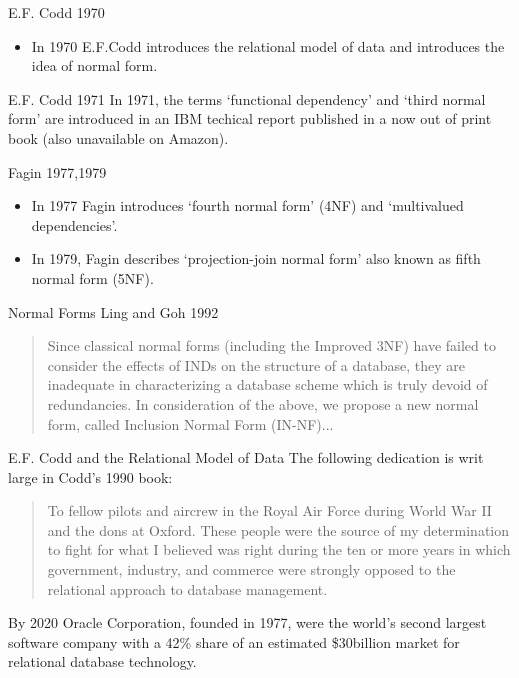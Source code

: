 
\begin{frame}{E.F. Codd 1970}
\begin{itemize}
	\item In 1970 E.F.Codd introduces the relational model of data and introduces the idea of normal form.
\end{itemize}
\end{frame}

\begin{frame}{E.F. Codd 1971}
In 1971, the terms `functional dependency' and  `third normal form' are introduced 
in an IBM techical report published in a now out of print book (also unavailable on Amazon).

\end{frame}

\begin{frame}{Fagin 1977,1979}
\begin{itemize}
	\item In 1977 Fagin introduces `fourth normal form' (4NF) and `multivalued dependencies'.
	\item In 1979, Fagin describes `projection-join normal form' also known as fifth normal form (5NF).
\end{itemize}

\end{frame}

\begin{frame}{Normal Forms}
Ling and Goh 1992 
\begin{quote}
Since
classical normal forms (including the Improved 3NF)
have failed to consider the effects of INDs on the structure
of a database, they are inadequate in characterizing a
database scheme which is truly devoid of redundancies.
In consideration of the above, we propose a new normal
form, called Inclusion Normal Form (IN-NF)...
\end{quote}
\end{frame}

\begin{frame}{E.F. Codd and the Relational Model of Data}
The following dedication is writ large in Codd's 1990 book:
\begin{quote}
To fellow pilots and aircrew
in the Royal Air Force
during World War II
and the dons at Oxford.
These people were the source of my determination to
fight for what I believed was right during the ten or
more years in which government, industry, and
commerce were strongly opposed to the relational
approach to database management.
\end{quote} 

By 2020 Oracle Corporation, founded in 1977, were the world's second largest software company with a 42\% share of an 
estimated \$30billion market for relational database technology. 
\end{frame}

